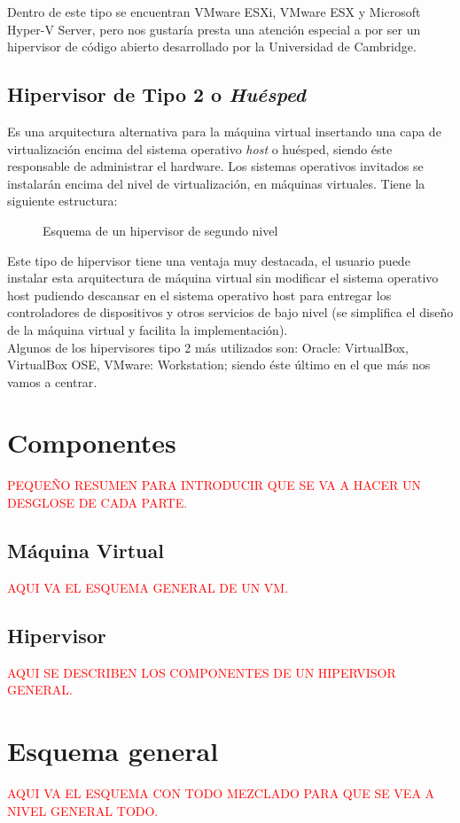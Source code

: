 Dentro de este tipo se encuentran VMware ESXi, VMware ESX y Microsoft Hyper-V Server, pero nos gustaría presta una atención especial a  por ser un hipervisor de código abierto desarrollado por la Universidad de Cambridge\cite{proyectoxen}\cite{proyectoxen2}.
\subsection{Hipervisor de Tipo 2 o \emph{Huésped}}
Es una arquitectura alternativa para la máquina virtual insertando una capa de virtualización encima del sistema operativo \emph{host} o huésped, siendo éste responsable de administrar el hardware. Los sistemas operativos invitados se instalarán encima del nivel de virtualización, en máquinas virtuales. Tiene la siguiente estructura:

\begin{figure}[H]
\begin{center}
\end{center}
\caption[Hipervisor Tipo 2]{Esquema de un hipervisor de segundo nivel}
\end{figure}

Este tipo de hipervisor tiene una ventaja muy destacada, el usuario puede instalar esta arquitectura de máquina virtual sin modificar el sistema operativo host pudiendo descansar en el sistema operativo host para entregar los controladores de dispositivos y otros servicios de bajo nivel (se simplifica el diseño de la máquina virtual y facilita la implementación).\\

Algunos de los hipervisores tipo 2 más utilizados son: Oracle: VirtualBox, VirtualBox OSE, VMware: Workstation; siendo éste último en el que más nos vamos a centrar.

\section{Componentes}

\textcolor{red}{PEQUEÑO RESUMEN PARA INTRODUCIR QUE SE VA A HACER UN DESGLOSE DE CADA PARTE.}

\subsection{Máquina Virtual}

\textcolor{red}{AQUI VA EL ESQUEMA GENERAL DE UN VM.}


\subsection{Hipervisor}

\textcolor{red}{AQUI SE DESCRIBEN LOS COMPONENTES DE UN HIPERVISOR GENERAL.}

\section{Esquema general}

\textcolor{red}{AQUI VA EL ESQUEMA CON TODO MEZCLADO PARA QUE SE VEA A NIVEL GENERAL TODO.}
